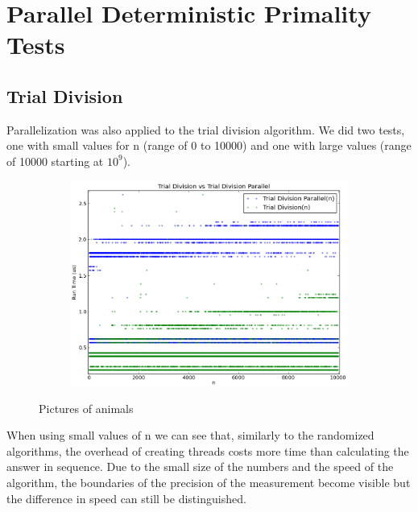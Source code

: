 \documentclass[compressed,final,notitlepage,narroweqnarray,inline,twoside,]{ieee}
\begin{document}
\section{Parallel Deterministic Primality Tests}
\subsection{Trial Division}
Parallelization was also applied to the trial division algorithm. We did two tests, one with small values for n (range of 0 to 10000) and one with large values (range of 10000 starting at $10^9$).
\begin{figure}[H]
        \centering
        \begin{subfigure}[b]{0.5\textwidth}
                \includegraphics[width=\textwidth]{../images/isPrime_par_comparison_small}
                \label{fig:gull}
        \end{subfigure}
        \caption{Pictures of animals}\label{fig:animals}
\end{figure}
 When using small values of n we can see that, similarly to the randomized algorithms, the overhead of creating threads costs more time than calculating the answer in sequence. Due to the small size of the numbers and the speed of the algorithm, the boundaries of the precision of the measurement become visible but the difference in speed can still be distinguished.
\end{document}
